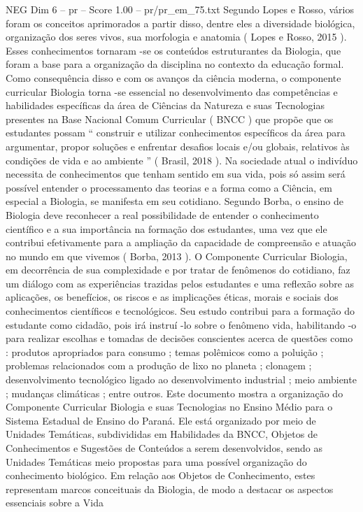 \begin{textsample}{NEG Dim 6 – pr – Score 1.00 – pr/pr\_em\_75.txt}
Segundo Lopes e Rosso, vários foram os conceitos aprimorados a partir disso, dentre eles a diversidade biológica, organização dos seres vivos, sua morfologia e anatomia ( Lopes e Rosso, 2015 ).
Esses conhecimentos tornaram -se os conteúdos estruturantes da Biologia, que foram a base para a organização da disciplina no contexto da educação formal.
Como consequência disso e com os avanços da ciência moderna, o componente curricular Biologia torna -se essencial no desenvolvimento das competências e habilidades específicas da área de Ciências da Natureza e suas Tecnologias presentes na Base Nacional Comum Curricular ( BNCC ) que propõe que os estudantes possam “ construir e utilizar conhecimentos específicos da área para argumentar, propor soluções e enfrentar desafios locais e/ou globais, relativos às condições de vida e ao ambiente ” ( Brasil, 2018 ).
Na sociedade atual o indivíduo necessita de conhecimentos que tenham sentido em sua vida, pois só assim será possível entender o processamento das teorias e a forma como a Ciência, em especial a Biologia, se manifesta em seu cotidiano.
Segundo Borba, o ensino de Biologia deve reconhecer a real possibilidade de entender o conhecimento científico e a sua importância na formação dos estudantes, uma vez que ele contribui efetivamente para a ampliação da capacidade de compreensão e atuação no mundo em que vivemos ( Borba, 2013 ).
O Componente Curricular Biologia, em decorrência de sua complexidade e por tratar de fenômenos do cotidiano, faz um diálogo com as experiências trazidas pelos estudantes e uma reflexão sobre as aplicações, os benefícios, os riscos e as implicações éticas, morais e sociais dos conhecimentos científicos e tecnológicos.
Seu estudo contribui para a formação do estudante como cidadão, pois irá instruí -lo sobre o fenômeno vida, habilitando -o para realizar escolhas e tomadas de decisões conscientes acerca de questões como : produtos apropriados para consumo ; temas polêmicos como a poluição ; problemas relacionados com a produção de lixo no planeta ; clonagem ; desenvolvimento tecnológico ligado ao desenvolvimento industrial ; meio ambiente ; mudanças climáticas ; entre outros.
Este documento mostra a organização do Componente Curricular Biologia e suas Tecnologias no Ensino Médio para o Sistema Estadual de Ensino do Paraná.
Ele está organizado por meio de Unidades Temáticas, subdivididas em Habilidades da BNCC, Objetos de Conhecimentos e Sugestões de Conteúdos a serem desenvolvidos, sendo as Unidades Temáticas meio propostas para uma possível organização do conhecimento biológico.
Em relação aos Objetos de Conhecimento, estes representam marcos conceituais da Biologia, de modo a destacar os aspectos essenciais sobre a Vida

\end{textsample}
